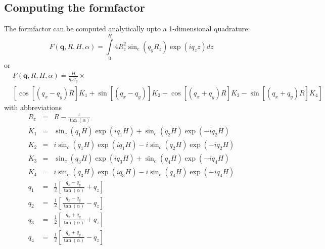 \subsection{Computing the formfactor}
The formfactor can be computed analytically upto a 1-dimensional quadrature:
\begin{equation}
F(\mathbf q, R, H,\alpha) = \int\limits_{0}^{H}{4R_z^2\sin_c(q_yR_z)\exp(iq_zz)dz} 
\label{eq:ffpyramid}
\end{equation}
or
\begin{equation}
\begin{aligned}
 & F(\mathbf q, R, H,\alpha) = \frac{H}{q_xq_y}\times \\  
 & \left[ \cos[(q_x-q_y)R]K_1 + \sin[(q_x-q_y)]K_2 - \cos[(q_x+q_y)R]K_3 - \sin[(q_x+q_y)R]K_4 \right] 
\end{aligned}
\end{equation}
with abbreviations
\begin{eqnarray}
R_z &=& R - \frac{z}{\tan(\alpha)} \\
K_1 &=& \sin_c(q_1H)\exp(iq_1H) + \sin_c(q_2H)\exp(-iq_2H) \\ 
K_2 &=& i\sin_c(q_1H)\exp(iq_1H) - i\sin_c(q_2H)\exp(-iq_2H) \\ 
K_3 &=& \sin_c(q_3H)\exp(iq_3H) + \sin_c(q_4H)\exp(-iq_4H) \\ 
K_4 &=& i\sin_c(q_3H)\exp(iq_3H) - i\sin_c(q_4H)\exp(-iq_4H) \\
q_1 &=& \frac{1}{2}\left[\frac{q_x-q_y}{\tan(\alpha)} + q_z\right] \\ 
q_2 &=& \frac{1}{2}\left[\frac{q_x-q_y}{\tan(\alpha)} - q_z\right] \\
q_3 &=& \frac{1}{2}\left[\frac{q_x+q_y}{\tan(\alpha)} + q_z\right] \\
q_4 &=& \frac{1}{2}\left[\frac{q_x+q_y}{\tan(\alpha)} - q_z\right] 
\end{eqnarray}

